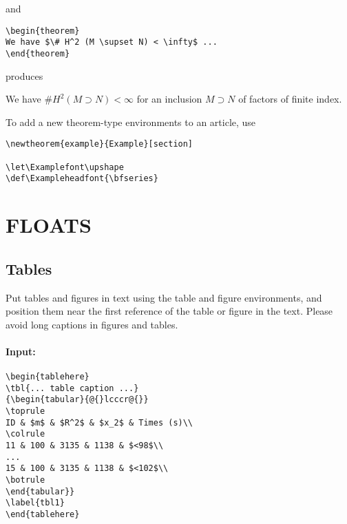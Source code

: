 \documentclass{ws-bme}
\begin{document}
\begin{multicols}{2}
\noindent and

\begin{verbatim}
\begin{theorem}
We have $\# H^2 (M \supset N) < \infty$ ...
\end{theorem}
\end{verbatim}

\noindent produces

\begin{theorem}
We have $\# H^2 (M \supset N) < \infty$ for an inclusion $M \supset
N$ of factors of finite index.
\end{theorem}

To add a new theorem-type environments to an article, use

\begin{verbatim}
\newtheorem{example}{Example}[section]

\let\Examplefont\upshape
\def\Exampleheadfont{\bfseries}
\end{verbatim}

\section*{FLOATS}
\subsection*{Tables}
Put tables and figures in text using the table and figure environments,
and position them near the first reference of the table or figure in
the text. Please avoid long captions in figures and tables.

\paragraph{Input:}

\begin{verbatim}
\begin{tablehere}
\tbl{... table caption ...}
{\begin{tabular}{@{}lcccr@{}}
\toprule
ID & $m$ & $R^2$ & $x_2$ & Times (s)\\
\colrule
11 & 100 & 3135 & 1138 & $<98$\\
...
15 & 100 & 3135 & 1138 & $<102$\\
\botrule
\end{tabular}}
\label{tbl1}
\end{tablehere}
\end{verbatim}



\end{multicols}
\end{document}
